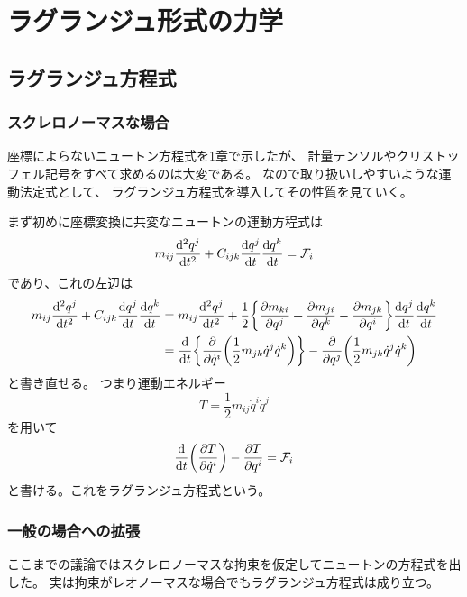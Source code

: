 \documentclass[../../master.tex]{subfiles}
\begin{document}
\setcounter{chapter}{1}
\chapter{ラグランジュ形式の力学}
\section{ラグランジュ方程式}
\subsection{スクレロノーマスな場合}
座標によらないニュートン方程式を1章で示したが、
計量テンソルやクリストッフェル記号をすべて求めるのは大変である。
なので取り扱いしやすいような運動法定式として、
ラグランジュ方程式を導入してその性質を見ていく。

まず初めに座標変換に共変なニュートンの運動方程式は
\begin{equation*}
    m_{ij}\dv[2]{q^j}{t} +C_{ijk}\dv{q^j}{t} \dv{q^k}{t} = \mathcal{F}_i
\end{equation*}
であり、これの左辺は
\begin{equation}
    \begin{split}
        m_{ij}\dv[2]{q^j}{t} +C_{ijk}\dv{q^j}{t} \dv{q^k}{t}
        &= m_{ij}\dv[2]{q^j}{t} +\frac{1}{2}\qty{\pdv{m_{ki}}{q^j}+\pdv{m_{ji}}{q^k}-\pdv{m_{jk}}{q^i}}\dv{q^j}{t} \dv{q^k}{t}\\
        &= \dv{t}\qty{\pdv{\dot{q}^i}\qty(\frac{1}{2}m_{jk}\dot{q}^j\dot{q}^k)} - \pdv{q^j}\qty(\frac{1}{2}m_{jk}\dot{q}^j\dot{q}^k)
    \end{split}
\end{equation}
と書き直せる。
つまり運動エネルギー
\begin{equation}
    T = \frac{1}{2}m_{ij}\dot{q}^i\dot{q}^j
\end{equation}
を用いて
\begin{equation}
    \dv{t}\qty(\pdv{T}{\dot{q}^i})-\pdv{T}{q^i} = \mathcal{F}_i
\end{equation}
と書ける。これをラグランジュ方程式という。

\subsection{一般の場合への拡張}
ここまでの議論ではスクレロノーマスな拘束を仮定してニュートンの方程式を出した。
実は拘束がレオノーマスな場合でもラグランジュ方程式は成り立つ。
\end{document}
